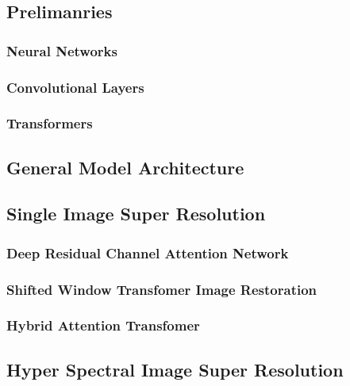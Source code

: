 \subsection{Prelimanries}

\subsubsection{Neural Networks}


\subsubsection{Convolutional Layers}


\subsubsection{Transformers}
\label{sec:transformer}


\newpage

\subsection{General Model Architecture}
\label{sec:general_model}


\subsection{Single Image Super Resolution}

\subsubsection{Deep Residual Channel Attention Network}


\subsubsection{Shifted Window Transfomer Image Restoration}


\subsubsection{Hybrid Attention Transfomer}
\label{subsec:hat}


\newpage

\subsection{Hyper Spectral Image Super Resolution}

